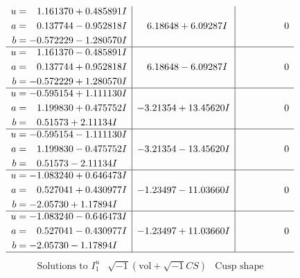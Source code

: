 \documentclass[1p]{elsarticle_modified}
\theoremstyle{definition}
\newcommand{\I}{\sqrt{-1}}
\begin{document}
$$\begin{array}{c|c|c}
\begin{aligned}
u &= \phantom{-}1.161370 + 0.485891 I \\
a &= \phantom{-}0.137744 - 0.952818 I \\
b &= -0.572229 - 1.280570 I\end{aligned}
 & \phantom{-}6.18648 + 6.09287 I & \phantom{-0.000000 } 0 \\ \hline\begin{aligned}
u &= \phantom{-}1.161370 - 0.485891 I \\
a &= \phantom{-}0.137744 + 0.952818 I \\
b &= -0.572229 + 1.280570 I\end{aligned}
 & \phantom{-}6.18648 - 6.09287 I & \phantom{-0.000000 } 0 \\ \hline\begin{aligned}
u &= -0.595154 + 1.111130 I \\
a &= \phantom{-}1.199830 + 0.475752 I \\
b &= \phantom{-}0.51573 + 2.11134 I\end{aligned}
 & -3.21354 + 13.45620 I & \phantom{-0.000000 } 0 \\ \hline\begin{aligned}
u &= -0.595154 - 1.111130 I \\
a &= \phantom{-}1.199830 - 0.475752 I \\
b &= \phantom{-}0.51573 - 2.11134 I\end{aligned}
 & -3.21354 - 13.45620 I & \phantom{-0.000000 } 0 \\ \hline\begin{aligned}
u &= -1.083240 + 0.646473 I \\
a &= \phantom{-}0.527041 + 0.430977 I \\
b &= -2.05730 + 1.17894 I\end{aligned}
 & -1.23497 - 11.03660 I & \phantom{-0.000000 } 0 \\ \hline\begin{aligned}
u &= -1.083240 - 0.646473 I \\
a &= \phantom{-}0.527041 - 0.430977 I \\
b &= -2.05730 - 1.17894 I\end{aligned}
 & -1.23497 + 11.03660 I & \phantom{-0.000000 } 0\\
 \hline 
 \end{array}$$\newpage$$\begin{array}{c|c|c}  
\text{Solutions to }I^u_{1}& \I (\text{vol} + \sqrt{-1}CS) & \text{Cusp shape}\\
 \hline 
\begin{aligned}

\end{aligned}
\end{array}$$
\end{document}
